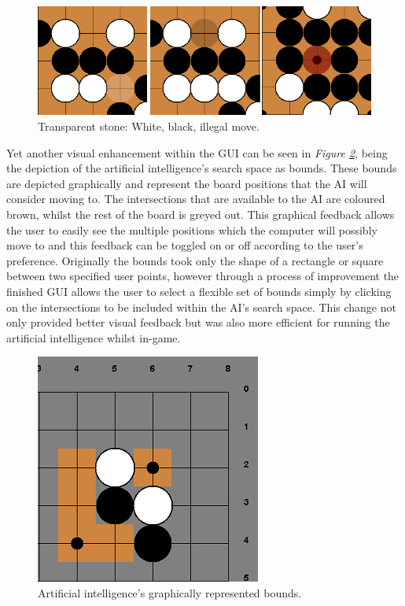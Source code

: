 \documentclass{l3proj}
\begin{document}
\begin{figure}[H]
\centering
\includegraphics[scale=0.7]{Images/GUI-4-Transparent.png}
\caption{Transparent stone: White, black, illegal move.}
\label{TransparentStones}
\end{figure}

Yet another visual enhancement within the GUI can be seen in \textit{Figure \ref{BoundPic}}, being the depiction of the artificial intelligence's search space as bounds. These bounds are depicted graphically and represent the board positions that the AI will consider moving to. The intersections that are available to the AI are coloured brown, whilst the rest of the board is greyed out. This graphical feedback allows the user to easily see the multiple positions which the computer will possibly move to and this feedback can be toggled on or off according to the user's preference. Originally the bounds took only the shape of a rectangle or square between two specified user points, however through a process of improvement the finished GUI allows the user to select a flexible set of bounds simply by clicking on the intersections to be included within the AI's search space. This change not only provided better visual feedback but was also more efficient for running the artificial intelligence whilst in-game.

\begin{figure}[H]
\centering
\includegraphics[scale=1]{Images/GUI-5-Bounds.png}
\caption{Artificial intelligence's graphically represented bounds.}
\label{BoundPic}
\end{figure}
\end{document}
